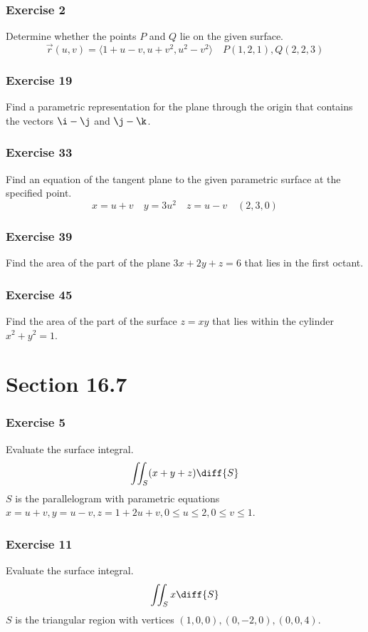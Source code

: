 \documentclass{math}
\begin{document}
\subsubsection*{Exercise 2}
Determine whether the points \( P \) and \( Q \) lie on the given surface.
\[ \vec{r}(u,v) = \langle1+u-v,u+v^2,u^2-v^2\rangle \quad P(1,2,1),Q(2,2,3) \]

\subsubsection*{Exercise 19}
Find a parametric representation for the plane through the origin that contains
the vectors \( \i-\j \) and \( \j-\k \).

\subsubsection*{Exercise 33}
Find an equation of the tangent plane to the given parametric surface at the
specified point.
\[ x = u+v \quad y = 3u^2 \quad z = u-v \quad (2,3,0) \]

\subsubsection*{Exercise 39}
Find the area of the part of the plane \( 3x+2y+z = 6 \) that lies in the first
octant.

\subsubsection*{Exercise 45}
Find the area of the part of the surface \( z = xy \) that lies within the
cylinder \( x^2+y^2 = 1 \).

\section*{Section 16.7}

\subsubsection*{Exercise 5}
Evaluate the surface integral.
\[ \iint_{S}(x+y+z)\diff{S} \]
\( S \) is the parallelogram with parametric equations \( x = u+v, y = u-v,
z = 1+2u+v, 0\le u\le 2, 0\le v\le 1 \).

\subsubsection*{Exercise 11}
Evaluate the surface integral.
\[ \iint_{S}x\diff{S} \]
\( S \) is the triangular region with vertices \( (1,0,0),(0,-2,0),(0,0,4) \).
\end{document}
